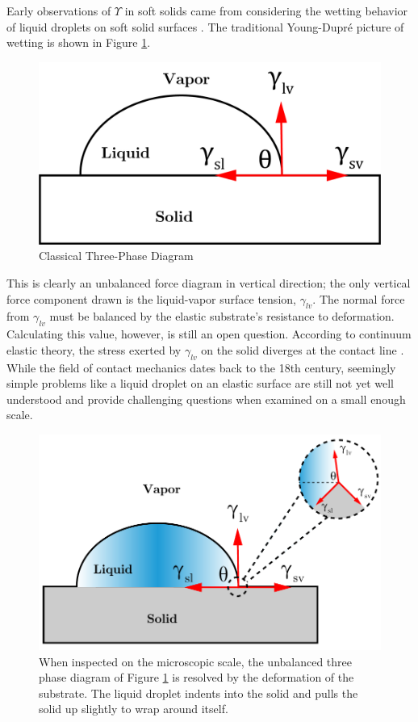 Early observations of $ \Upsilon $ in soft solids came from considering the wetting behavior of liquid droplets on soft solid surfaces \cite{xu2017direct,jerison2011deformation,style2013universal,xu2018surface}. The traditional Young-Dupr\'{e} picture of wetting is shown in Figure \ref{fig:three-phase}.
\begin{figure}[h!]
	\centering
	\includegraphics[width=.6\textwidth]{Chapters/Figures/phase_diagram.PNG}
	\caption[Three-Phase Diagram]{Classical Three-Phase Diagram}
	\label{fig:three-phase} 
\end{figure}
This is clearly an unbalanced force diagram in vertical direction; the only vertical force component drawn is the liquid-vapor surface tension, $ \gamma_{lv} $. The normal force from $\gamma_{lv}$ must be balanced by the elastic substrate's resistance to deformation. Calculating this value, however, is still an open question. According to continuum elastic theory, the stress exerted by $\gamma_{lv}$ on the solid diverges at the contact line \cite{jerison2011deformation}. While the field of contact mechanics dates back to the 18th century, seemingly simple problems like a liquid droplet on an elastic surface are still not yet well understood and provide challenging questions when examined on a small enough scale. 

\begin{figure}[h!]
	\centering
	\includegraphics[width=.6\textwidth]{Chapters/Figures/phase_diagram}
	\caption[Three-Phase Diagram: Zoomed]{When inspected on the microscopic scale, the unbalanced three phase diagram of Figure \ref{fig:three-phase} is resolved by the deformation of the substrate. The liquid droplet indents into the solid and pulls the solid up slightly to wrap around itself.}
	\label{fig:three-phase-zoomed} 
\end{figure}

